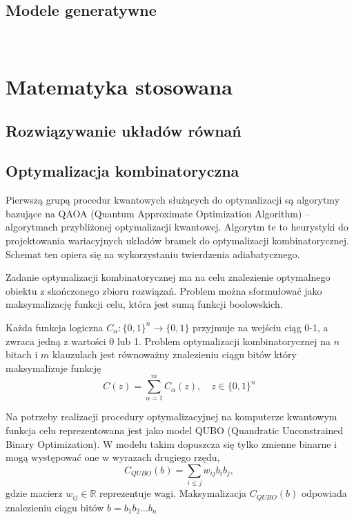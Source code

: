 \documentclass[a4paper,11pt]{article}
\begin{document}
\subsection{Modele generatywne}
\newpage
\ 
\newpage

\section{Matematyka stosowana}
\newpage
\subsection{Rozwiązywanie układów równań}
\newpage
\subsection{Optymalizacja kombinatoryczna}

Pierwszą grupą procedur kwantowych służących do optymalizacji są algorytmy bazujące na QAOA (Quantum Approximate Optimization Algorithm) -- algorytmach przybliżonej optymalizacji kwantowej. Algorytm te to heurystyki do projektowania wariacyjnych układów bramek do optymalizacji kombinatorycznej. Schemat ten opiera się na wykorzystaniu twierdzenia adiabatycznego.


Zadanie optymalizacji kombinatorycznej ma na celu znalezienie optymalnego obiektu z skończonego zbioru rozwiązań. Problem można sformułować jako maksymalizację funkcji celu, która jest sumą funkcji boolowskich.

Każda funkcja logiczna $C_\alpha:\{0,1\}^n\rightarrow\{0,1\}$ przyjmuje na wejściu ciąg 0-1, a zwraca jedną z wartości 0 lub 1. Problem optymalizacji kombinatorycznej na $n$ bitach i $m$ klauzulach jest równoważny znalezieniu ciągu bitów który maksymalizuje funkcję
\[
C (z) = \sum_{\alpha = 1}^m C_\alpha(z), \quad z\in\{0,1\}^n
\] 

Na potrzeby realizacji procedury optymalizacyjnej na komputerze kwantowym funkcja celu reprezentowana jest jako model QUBO (Quandratic Unconstrained Binary Optimization). W modelu takim dopuszcza się tylko zmienne binarne i mogą występować one w wyrazach drugiego rzędu,
\[
C_{QUBO}(b) = \sum_{i\leq j}w_{ij} b_i b_j,
\]
gdzie macierz $w_{ij}\in\mathds{R}$ reprezentuje wagi. Maksymalizacja  $C_{QUBO}(b)$ odpowiada znalezieniu ciągu bitów $b = b_1b_2\dots b_n$
\end{document}
